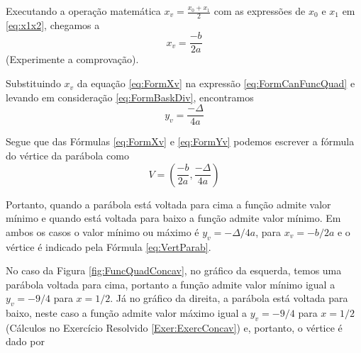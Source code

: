\documentclass[../main.tex]{subfiles}
\begin{document}
Executando a operação matemática $x_v = \frac{x_0 + x_1}{2}$ com as expressões de $x_0$ e $x_1$ em \ref{eq:x1x2}, chegamos a 
\begin{equation}
    x_v=\frac{-b}{2a}\label{eq:FormXv}
\end{equation}
(\dica Experimente a comprovação).

Substituindo  $x_v$ da equação \ref{eq:FormXv} na expressão \ref{eq:FormCanFuncQuad} e levando em consideração \ref{eq:FormBaskDiv},  encontramos 
\begin{equation}
    y_v=\frac{-\Delta}{4a}\label{eq:FormYv}
\end{equation}

Segue que das Fórmulas \ref{eq:FormXv} e \ref{eq:FormYv} podemos escrever a fórmula do vértice da parábola como 
\begin{equation}
    V = \left(\frac{-b}{2a}, \frac{-\Delta}{4a}\right)\label{eq:VertParab}
\end{equation}

Portanto, quando a parábola está voltada para cima a função admite valor mínimo e quando está voltada para baixo a função admite valor mínimo. Em ambos os casos o valor mínimo ou máximo é  $y_v=-\Delta/4a$, para $x_v=-b/2a$ e o vértice é indicado pela Fórmula \ref{eq:VertParab}.

No caso da Figura \ref{fig:FuncQuadConcav}, no gráfico da esquerda, temos uma parábola voltada para cima, portanto a função admite valor mínimo igual a $y_v=-9/4$ para $x=1/2$. Já no gráfico da direita, a parábola está voltada para baixo, neste caso a função admite valor máximo igual a $y_v=-9/4$ para $x=1/2$ (Cálculos no Exercício Resolvido \ref{Exer:ExercConcav}) e, portanto, o vértice é dado por
\end{document}
